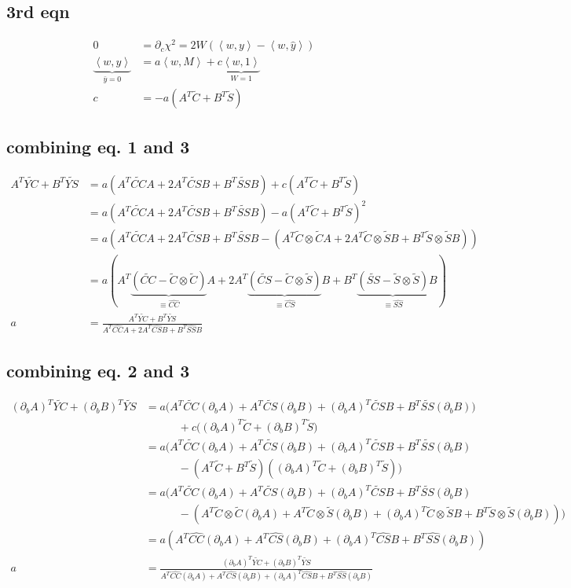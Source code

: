 \documentclass[notitlepage]{article}
\newcommand{\Cc}[1][n]{\widetilde{C}}
\newcommand{\Ss}[1][n]{\widetilde{S}}
\newcommand{\CCc}[1][nm]{\widetilde{CC}}
\newcommand{\SSs}[1][nm]{\widetilde{SS}}
\newcommand{\CS}[1][nm]{\widetilde{CS}}
\newcommand{\YC}[1][n]{\widetilde{YC}}
\newcommand{\YS}[1][n]{\widetilde{YS}}
\newcommand{\Ybar}{\bar{y}}
\newcommand{\hatCS}[1][nm]{\widehat{CS}}
\newcommand{\hatCC}[1][nm]{\widehat{CC}}
\newcommand{\hatSS}[1][nm]{\widehat{SS}}
\newcommand{\iprod}[2]{\left<#1, #2\right>}
\newcommand{\oprod}[2]{#1 \otimes #2}
\newcommand{\dA}{(\partial_b A)}
\newcommand{\dB}{(\partial_b B)}
\begin{document}
\subsection{3rd eqn}

\begin{align}
0 &= \partial_{c} \chi^2 = 2W(\iprod{w}{y} - \iprod{w}{\hat{y}})\\
\underbrace{\iprod{w}{y}}_{\Ybar=0} &= a\iprod{w}{M} + c\underbrace{\iprod{w}{1}}_{W=1}\\
c &= -a\left(A^T\Cc + B^T\Ss\right)
\end{align}


\subsection{combining eq. 1 and 3}
\begin{align}
A^T\YC + B^T \YS &= a(A^T\CCc A + 2A^T\CS B + B^T\SSs B) + c(A^T\Cc + B^T\Ss)\\
&= a(A^T\CCc A + 2A^T\CS B + B^T\SSs B) - a(A^T\Cc + B^T\Ss)^2\\
&= a\left(A^T\CCc A + 2A^T\CS B + B^T\SSs B - \left(A^T\oprod{\Cc}{\Cc}A + 2A^T\oprod{\Cc}{\Ss}B + B^T\oprod{\Ss}{\Ss}B\right)\right)\\
&= a\left(A^T\underbrace{(\CCc - \oprod{\Cc}{\Cc})}_{\equiv \hatCC}A + 2A^T\underbrace{(\CS - \oprod{\Cc}{\Ss})}_{\equiv \hatCS}B + B^T\underbrace{(\SSs - \oprod{\Ss}{\Ss})}_{\equiv\hatSS}B\right)\\
a &= \frac{A^T\YC + B^T \YS}{A^T\hatCC A + 2A^T\hatCS B + B^T\hatSS B}
\end{align}

\subsection{combining eq. 2 and 3}
\begin{align}
\dA^T\YC + \dB^T\YS &= a\big(A^T\CCc \dA + A^T\CS\dB + \dA^T\CS B + B^T\SSs\dB\big) \\
					&\qquad\quad + c\big(\dA^T\Cc + \dB^T\Ss\big)\\
					&= a\bigg(A^T\CCc \dA + A^T\CS\dB + \dA^T\CS B + B^T\SSs\dB\\
					&\qquad\quad - \left(A^T\Cc + B^T\Ss\right)\left(\dA^T\Cc + \dB^T\Ss\right)\bigg)\\
					&=a\bigg(A^T\CCc \dA + A^T\CS\dB + \dA^T\CS B + B^T\SSs \dB\\
					&\qquad\quad - \left(A^T\oprod{\Cc}{\Cc}\dA + A^T\oprod{\Cc}{\Ss}\dB + \dA^T\oprod{\Cc}{\Ss}B + B^T\oprod{\Ss}{\Ss}\dB \right)\bigg)\\
					&=a\left(A^T\hatCC \dA + A^T\hatCS\dB + \dA^T\hatCS B + B^T\hatSS \dB\right)\\
			   a    &= \frac{\dA^T\YC + \dB^T\YS}{A^T\hatCC \dA + A^T\hatCS\dB + \dA^T\hatCS B + B^T\hatSS \dB}
\end{align}
\end{document}
